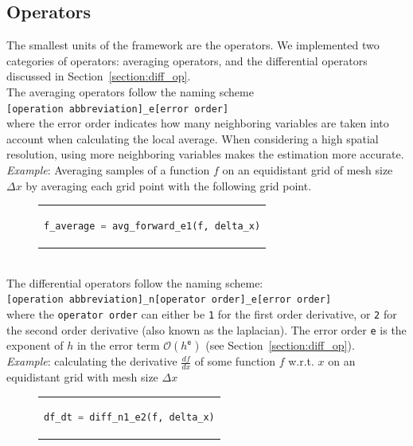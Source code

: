 \subsection{Operators}
The smallest units of the framework are the operators.
We implemented two categories of operators: averaging operators, and the differential operators discussed in Section~\ref{section:diff_op}.
\\

\noindent
The averaging operators follow the naming scheme
\\
\texttt{[operation abbreviation]\_e[error order]}
\\
where the error order indicates how many neighboring variables are taken into account when calculating the local average.
When considering a high spatial resolution, using more neighboring variables makes the estimation more accurate.
\\
\emph{Example}: Averaging samples of a function $f$ on an equidistant grid of mesh size $\Delta x$ by averaging each grid point with the following grid point.
\begin{figure}[htpb]
  \centering
  \begin{tabular}{c}
  \begin{lstlisting}[language=Python]
    f_average = avg_forward_e1(f, delta_x)
  \end{lstlisting}
  \end{tabular}
\end{figure}
\\
The differential operators follow the naming scheme:
\\
\texttt{[operation abbreviation]\_n[operator order]\_e[error order]}
\\
where the \texttt{operator order} can either be \texttt{1} for the first order derivative, or \texttt{2} for the second order derivative (also known as the laplacian).
The error order \texttt{e} is the exponent of $h$ in the error term $\mathcal{O}(h^\texttt{e})$ (see Section~\ref{section:diff_op}).
\\
\emph{Example}: calculating the derivative $\frac{df}{dx}$ of some function $f$ w.r.t. $x$ on an equidistant grid with mesh size $\Delta x$
\begin{figure}[htpb]
  \centering
  \begin{tabular}{c}
  \begin{lstlisting}[language=Python]
    df_dt = diff_n1_e2(f, delta_x)
  \end{lstlisting}
  \end{tabular}
\end{figure}

